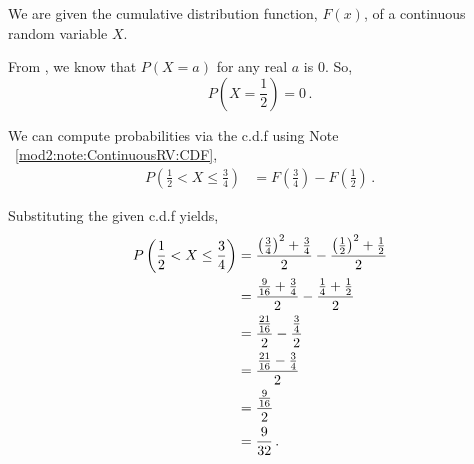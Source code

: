 %
%


\begin{subquestions}
	
\subquestion

We are given the cumulative distribution function, $F(x)$, of a continuous random variable $X$.
	
\begin{subsubquestions}
	
\subsubquestion

From , we know that $P(X=a)$ for any real $a$ is $0$. So,
\begin{equation}
	P\left(X= \frac{1}{2}\right) = 0 \,.
\end{equation}
	

\subsubquestion

We can compute probabilities via the c.d.f using Note ~\ref{mod2:note:ContinuousRV:CDF}, 
\begin{align}
	P\left(\frac{1}{2} < X \leq \frac{3}{4}\right) & = F\left(\frac{3}{4}\right) - F\left(\frac{1}{2}\right) \,.
\end{align}

Substituting the given c.d.f yields,
\begin{align}
P\left(\frac{1}{2} < X \leq \frac{3}{4}\right)	                                    & = \frac{\left(\frac{3}{4}\right)^2+\frac{3}{4}}{2} -   \frac{\left(\frac{1}{2}\right)^2+\frac{1}{2}}{2} \nonumber \\
	                                    & = \frac{\frac{9}{16}+\frac{3}{4}}{2} - \frac{\frac{1}{4}+\frac{1}{2}}{2} \nonumber \\
	                                    & = \frac{\frac{21}{16}}{2} - \frac{\frac{3}{4}}{2} \nonumber \\
	                                    & = \frac{\frac{21}{16} - \frac{3}{4}}{2} \nonumber \\
	                                    & = \frac{\frac{9}{16}}{2} \nonumber \\
	                                    & = \frac{9}{32} \,.
\end{align}


\end{subsubquestions}
\end{subquestions}

